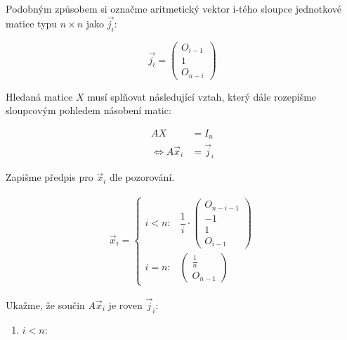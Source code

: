 \documentclass[12pt]{article}
\begin{document}
\begin{enumerate}
\begin{enumerate}
        Podobným způsobem si označme aritmetický vektor i-tého sloupce jednotkové matice typu $n \times n$ jako $\vec{j_i}$:

        \[
          \vec{j_i} = \left(\begin{array}{c} 
              O_{i-1} \\ \hline 1 \\ \hline O_{n-i}
            \end{array}\right)
        \]

        Hledaná matice $X$ musí splňovat následující vztah, který dále rozepišme sloupcovým pohledem násobení matic:

        \begin{align*}
          AX &= I_n \\
          \Leftrightarrow A\vec{x}_i &= \vec{j}_i
        \end{align*}

        Zapišme předpis pro $\vec{x}_i$ dle pozorování.

        \begin{align*}
          \vec{x}_i  = 
            \begin{cases}
            i < n: & \dfrac{1}{i} \cdot \left(\begin{array}{c} 
                O_{n-i-1} \\ \hline -1 \\ 1 \\ \hline O_{i-1}
              \end{array}\right) 
            \\[6pt]
            i=n: & \left(\begin{array}{c} 
                \frac{1}{n} \\ \hline O_{n-1}
              \end{array}\right) 
            \end{cases}
        \end{align*}

        Ukažme, že součin $A\vec{x}_i$ je roven $\vec{j}_i$:
          \begin{enumerate}
            \item $i<n$:
              

\end{enumerate}
\end{enumerate}
\end{enumerate}
\end{document}
